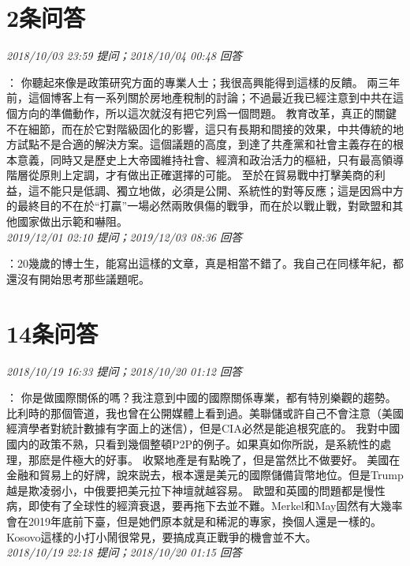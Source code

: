\documentclass[twocolumn]{ctexart}
\begin{document}
\section{2条问答}

\textit{\hfill\noindent\small 2018/10/03 23:59 提问；2018/10/04 00:48 回答}

：
你聽起來像是政策研究方面的專業人士；我很高興能得到這樣的反饋。
兩三年前，這個博客上有一系列關於房地產稅制的討論；不過最近我已經注意到中共在這個方向的準備動作，所以這次就沒有把它列爲一個問題。
教育改革，真正的關鍵不在細節，而在於它對階級固化的影響，這只有長期和間接的效果，中共傳統的地方試點不是合適的解決方案。這個議題的高度，到達了共產黨和社會主義存在的根本意義，同時又是歷史上大帝國維持社會、經濟和政治活力的樞紐，只有最高領導階層從原則上定調，才有做出正確選擇的可能。
至於在貿易戰中打擊美商的利益，這不能只是低調、獨立地做，必須是公開、系統性的對等反應；這是因爲中方的最終目的不在於“打贏”一場必然兩敗俱傷的戰爭，而在於以戰止戰，對歐盟和其他國家做出示範和嚇阻。
\\

\textit{\hfill\noindent\small 2019/12/01 02:10 提问；2019/12/03 08:36 回答}

：20幾歲的博士生，能寫出這樣的文章，真是相當不錯了。我自己在同樣年紀，都還沒有開始思考那些議題呢。
\\

\section{14条问答}

\textit{\hfill\noindent\small 2018/10/19 16:33 提问；2018/10/20 01:12 回答}

：
你是做國際關係的嗎？我注意到中國的國際關係專業，都有特別樂觀的趨勢。
比利時的那個管道，我也曾在公開媒體上看到過。美聯儲或許自己不會注意（美國經濟學者對統計數據有字面上的迷信），但是CIA必然是能追根究底的。
我對中國國内的政策不熟，只看到幾個整頓P2P的例子。如果真如你所説，是系統性的處理，那麽是件極大的好事。
收緊地產是有點晚了，但是當然比不做要好。
美國在金融和貿易上的好牌，說來説去，根本還是美元的國際儲備貨幣地位。但是Trump越是欺凌弱小，中俄要把美元拉下神壇就越容易。
歐盟和英國的問題都是慢性病，即使有了全球性的經濟衰退，要再拖下去並不難。Merkel和May固然有大幾率會在2019年底前下臺，但是她們原本就是和稀泥的專家，換個人還是一樣的。Kosovo這樣的小打小鬧很常見，要搞成真正戰爭的機會並不大。
\\

\textit{\hfill\noindent\small 2018/10/19 22:18 提问；2018/10/20 01:15 回答}
\end{document}
